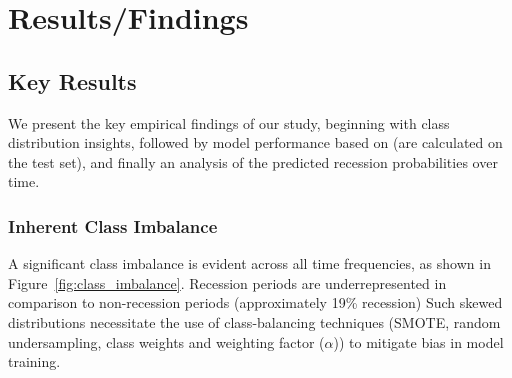 \section{Results/Findings}

\subsection{Key Results}

We present the key empirical findings of our study, beginning with class distribution insights, followed by model performance based on \AUCone (\AUCtwos are calculated on the test set), and finally an analysis of the predicted recession probabilities over time.

\subsubsection{Inherent Class Imbalance}

A significant class imbalance is evident across all time frequencies, as shown in Figure~\ref{fig:class_imbalance}. Recession periods are underrepresented in comparison to non-recession periods (approximately 19\% recession) Such skewed distributions necessitate the use of class-balancing techniques (SMOTE, random undersampling, class weights and weighting factor ($\alpha$)) to mitigate bias in model training.


